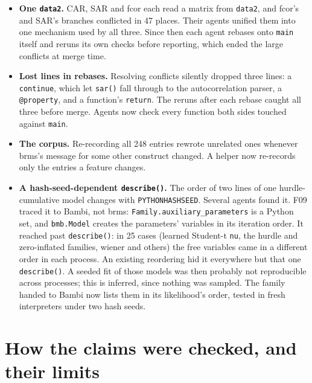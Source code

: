 \documentclass[11pt]{article}
\newcommand{\code}[1]{\texttt{#1}}
\begin{document}
\begin{itemize}
\item \textbf{One \code{data2}.} CAR, SAR and fcor each read a matrix from \code{data2}, and fcor's and SAR's branches
  conflicted in 47 places. Their agents unified them into one mechanism used by all three. Since then each agent rebases
  onto \code{main} itself and reruns its own checks before reporting, which ended the large conflicts at merge time.
\item \textbf{Lost lines in rebases.} Resolving conflicts silently dropped three lines: a \code{continue}, which let
  \code{sar()} fall through to the autocorrelation parser, a \code{@property}, and a function's \code{return}. The reruns
  after each rebase caught all three before merge. Agents now check every function both sides touched against
  \code{main}.
\item \textbf{The corpus.} Re-recording all 248 entries rewrote unrelated ones whenever brms's message for some other
  construct changed. A helper now re-records only the entries a feature changes.
\item \textbf{A hash-seed-dependent \code{describe()}.} The order of two lines of one hurdle-cumulative model changes with
  \code{PYTHONHASHSEED}. Several agents found it. F09 traced it to Bambi, not brms: \code{Family.auxiliary\_parameters} is a Python set, and
  \code{bmb.Model} creates the parameters' variables in its iteration order. It reached past \code{describe()}: in 25
  cases (learned Student-t \code{nu}, the hurdle and zero-inflated families, wiener and others) the free variables came in
  a different order in each process. An existing reordering hid it everywhere but that one \code{describe()}. A seeded
  fit of those models was then probably not reproducible across processes; this is inferred, since nothing was sampled.
  The family handed to Bambi now lists them in its likelihood's order, tested in fresh interpreters under two hash
  seeds.
\end{itemize}

\section{How the claims were checked, and their limits}
\label{sec:checks}
\end{document}
